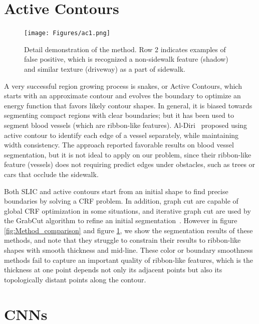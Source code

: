 \section{Active Contours}

\begin{figure}[H]
\centering
\texttt{[image: Figures/ac1.png]}
\caption[Example of Active Contours]{
Detail demonstration of the \ActiveContours{} method. 
Row 2 indicates examples of false positive, which is recognized a non-sidewalk feature 
(shadow) and similar texture (driveway) as a part of sidewalk.}
\label{fig:ac}
\end{figure}

A very successful region growing process is snakes, or Active Contours, which starts with an approximate contour and evolves the boundary to optimize an energy function that favors likely contour shapes. 
In general, it is biased towards segmenting compact regions with clear boundaries; but it has been used to segment blood vessels (which are ribbon-like features). 
Al-Diri~\cite{ActiveContou09} proposed using active contour to identify each edge of a vessel separately, while maintaining width consistency. 
The approach reported favorable results on blood vessel segmentation, but it is not ideal to apply on our problem, 
since their ribbon-like feature (vessels) does not requiring predict edges under obstacles,
 such as trees or cars that occlude the sidewalk.


Both \ac{SLIC} and active contours start from an initial shape to find precise boundaries by solving a \ac{CRF} problem. 
In addition, graph cut are capable of global \ac{CRF} optimization in some situations, and iterative graph cut are used by the GrabCut algorithm to refine an initial segmentation~\cite{Rother2004-ou}. However in figure \ref{fig:Method_comparison} and figure \ref{fig:ac}, we show the segmentation results of these methods, and note that they struggle to constrain their results to ribbon-like shapes with smooth thickness and mid-line.
These color or boundary smoothness methods fail to capture an important quality of ribbon-like features, which is the thickness at one point depends not only its adjacent points but also its topologically distant points along the contour.

\section{\ac{CNNs}}

